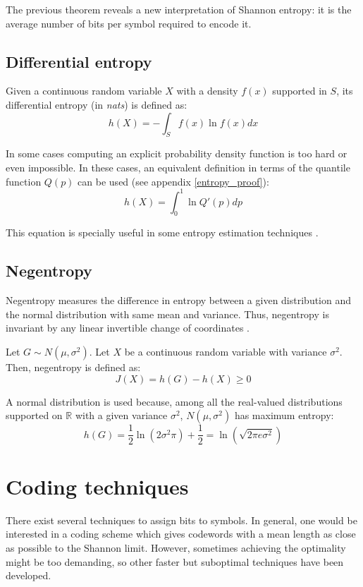 The previous theorem reveals a new interpretation of Shannon entropy: it is the average number of bits per symbol required to encode it.

\subsection{Differential entropy}
Given a continuous random variable $X$ with a density $f(x)$ supported in $S$, its differential entropy (in \textit{nats}) is defined as:
\begin{equation} \label{eq:differential_entropy}
h(X) = - \int_{S}^{} f(x) \ln f(x) dx
\end{equation}

In some cases computing an explicit probability density function is too hard or even impossible. In these cases, an equivalent definition in terms of the quantile function $Q(p)$ can be used (see appendix \ref{entropy_proof}):
\begin{equation} \label{eq:differential_entropy_q}
h(X) = \int_{0}^{1} \ln Q'(p) dp
\end{equation}

This equation is specially useful in some entropy estimation techniques \parencite{Vasicek}.

\subsection{Negentropy} \label{sec:negentropy}
Negentropy measures the difference in entropy between a given distribution and the normal distribution with same mean and variance. Thus, negentropy is invariant by any linear invertible change of coordinates \parencite{negentropy}. 

Let $G \sim N(\mu, \sigma^2)$. Let $X$ be a continuous random variable with variance $\sigma^2$. Then, negentropy is defined as:
\begin{equation}
J(X) = h(G) - h(X) \geq 0
\end{equation}

A normal distribution is used because, among all the real-valued distributions supported on $\mathbb{R}$ with a given variance $\sigma^2$, $N(\mu, \sigma^2)$ has maximum entropy:
\begin{equation}
h(G) = \frac{1}{2} \ln \left(2\sigma^2\pi\right) + \frac{1}{2} = \ln\left(\sqrt{2\pi e \sigma^2}\right)
\end{equation}

\section{Coding techniques}
There exist several techniques to assign bits to symbols. In general, one would be interested in a coding scheme which gives codewords with a mean length as close as possible to the Shannon limit. However, sometimes achieving the optimality might be too demanding, so other faster but suboptimal techniques have been developed.

